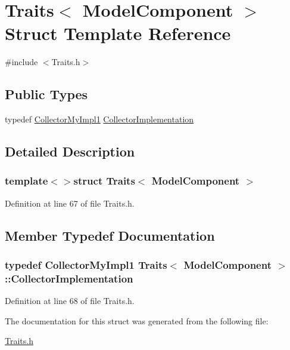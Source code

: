 \hypertarget{struct_traits_3_01_model_component_01_4}{\section{Traits$<$ Model\-Component $>$ Struct Template Reference}
\label{struct_traits_3_01_model_component_01_4}
}


{\ttfamily \#include $<$Traits.\-h$>$}

\subsection*{Public Types}
\begin{DoxyCompactItemize}
\item 
typedef \hyperlink{class_collector_my_impl1}{Collector\-My\-Impl1} \hyperlink{struct_traits_3_01_model_component_01_4_aea662c7138c7186aa5d60a6912d0010a}{Collector\-Implementation}
\end{DoxyCompactItemize}


\subsection{Detailed Description}
\subsubsection*{template$<$$>$struct Traits$<$ Model\-Component $>$}



Definition at line 67 of file Traits.\-h.



\subsection{Member Typedef Documentation}
\hypertarget{struct_traits_3_01_model_component_01_4_aea662c7138c7186aa5d60a6912d0010a}{
\subsubsection[{Collector\-Implementation}]{\setlength{\rightskip}{0pt plus 5cm}typedef {\bf Collector\-My\-Impl1} {\bf Traits}$<$ {\bf Model\-Component} $>$\-::{\bf Collector\-Implementation}}}\label{struct_traits_3_01_model_component_01_4_aea662c7138c7186aa5d60a6912d0010a}


Definition at line 68 of file Traits.\-h.



The documentation for this struct was generated from the following file\-:\begin{DoxyCompactItemize}
\item 
\hyperlink{_traits_8h}{Traits.\-h}\end{DoxyCompactItemize}
